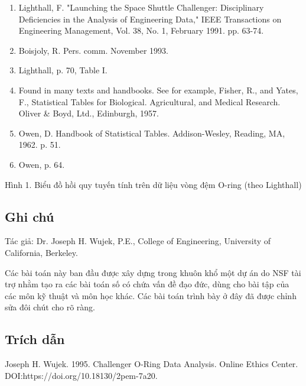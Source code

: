 \begin{enumerate}
\def\labelenumi{\arabic{enumi}.}
\item
  Lighthall, F. "Launching the Space Shuttle Challenger: Disciplinary Deficiencies in the Analysis of Engineering Data," IEEE Transactions on Engineering Management, Vol. 38, No. 1, February 1991. pp. 63-74.
\item
  Boisjoly, R. Pers. comm. November 1993.
\item
  Lighthall, p. 70, Table I.
\item
  Found in many texts and handbooks. See for example, Fisher, R., and Yates, F., Statistical Tables for Biological. Agricultural, and Medical Research. Oliver \& Boyd, Ltd., Edinburgh, 1957.
\item
  Owen, D. Handbook of Statistical Tables. Addison-Wesley, Reading, MA, 1962. p. 51.
\item
  Owen, p. 64.
\end{enumerate}

Hình 1. Biểu đồ hồi quy tuyến tính trên dữ liệu vòng đệm O-ring (theo Lighthall)

\subsection{Ghi chú}

Tác giả: Dr. Joseph H. Wujek, P.E., College of Engineering, University of California, Berkeley.

Các bài toán này ban đầu được xây dựng trong khuôn khổ một dự án do NSF tài trợ nhằm tạo ra các bài toán số có chứa vấn đề đạo đức, dùng cho bài tập của các môn kỹ thuật và môn học khác. Các bài toán trình bày ở đây đã được chỉnh sửa đôi chút cho rõ ràng.

\subsection{Trích dẫn}

Joseph H. Wujek. 1995. Challenger O-Ring Data Analysis. Online Ethics Center. DOI:https://doi.org/10.18130/2pem-7a20.
